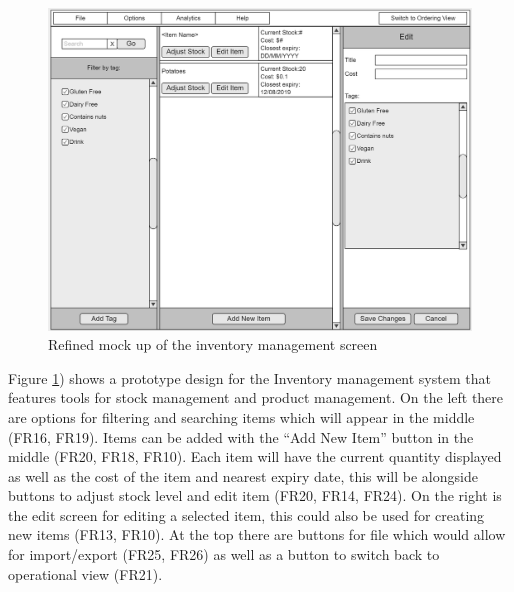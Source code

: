 \begin{figure}[ht]
	\centering
	\includegraphics[width=150mm]{images/GUI_prototypes/Inventory_screen.png}
	\caption{Refined mock up of the inventory management screen}
	\label{fig:management_screen_moqueup}
\end{figure}

Figure \ref{fig:management_screen_moqueup}) shows a prototype design for the Inventory management system that features tools for stock management and product management. On the left there are options for filtering and searching items which will appear in the middle (FR16, FR19). Items can be added with the “Add New Item” button in the middle (FR20, FR18, FR10). Each item will have the current quantity displayed as well as the cost of the item and nearest expiry date, this will be alongside buttons to adjust stock level and edit item (FR20, FR14, FR24). On the right is the edit screen for editing a selected item, this could also be used for creating new items (FR13, FR10). At the top there are buttons for file which would allow for import/export (FR25, FR26) as well as a button to switch back to operational view (FR21).